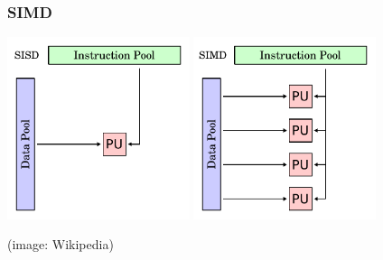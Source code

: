 \documentclass[xcolor={x11names,svgnames,psnames}]{beamer}
\begin{document}
\begin{frame}
\frametitle{SIMD}

\includegraphics[width=0.4\textwidth]{SISD}
\hfill
\includegraphics[width=0.4\textwidth]{SIMD}

\hfill (image: Wikipedia)

\end{frame}



\end{document}
